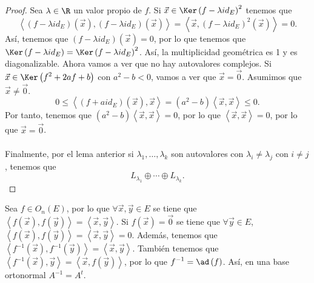 \begin{proof}
Sea $\displaystyle \lambda \in \R $ un valor propio de $\displaystyle f $. Si $\displaystyle \vec{x} \in \Ker\left(f- \lambda id _{E}\right)^{2} $ tenemos que
\[ \left\langle \left(f-\lambda id _{E}\right)\left(\vec{x}\right), \left(f-\lambda id _{E}\right)\left(\vec{x}\right) \right\rangle = \left\langle \vec{x}, \left(f- \lambda id _{E}\right)^{2}\left(\vec{x}\right) \right\rangle = 0 .\]
Así, tenemos que $\displaystyle \left(f- \lambda id _{E}\right)\left(\vec{x}\right) = 0 $, por lo que tenemos que $\displaystyle \Ker\left(f-\lambda id _{E}\right) = \Ker\left(f - \lambda id _{E}\right)^{2} $. Así, la multiplicidad geométrica  es 1 y es diagonalizable. 
Ahora vamos a ver que no hay autovalores complejos. Si $\displaystyle \vec{x} \in \Ker\left(f^{2}+2af+b\right) $ con $\displaystyle a^{2}-b<0 $, vamos a ver que $\displaystyle \vec{x} = \vec{0} $. Asumimos que $\displaystyle \vec{x} \neq \vec{0} $. 
\[ 0 \leq \left\langle \left(f+aid _{E}\right)\left(\vec{x}\right), \vec{x} \right\rangle = \left(a^{2}-b\right)\left\langle \vec{x}, \vec{x} \right\rangle \leq 0 .\]
Por tanto, tenemos que $\displaystyle \left(a^{2}-b\right)\left\langle \vec{x}, \vec{x} \right\rangle =0 $, por lo que $\displaystyle \left\langle \vec{x}, \vec{x} \right\rangle = 0 $, por lo que $\displaystyle \vec{x} = \vec{0} $. \\ \\
Finalmente, por el lema anterior si $\displaystyle \lambda_{1}, \ldots, \lambda_{k} $ son autovalores con $\displaystyle \lambda_{i} \neq \lambda_{j} $ con $\displaystyle i \neq j $, tenemos que
\[L_{\lambda_{1}} \oplus \cdots \oplus L_{\lambda_{k}} .\]
\end{proof}
\begin{observation}
\normalfont Sea $\displaystyle f \in O_{n}\left(E\right) $, por lo que $\displaystyle \forall \vec{x}, \vec{y} \in E $ se tiene que $\displaystyle \left\langle f\left(\vec{x}\right), f\left(\vec{y}\right) \right\rangle = \left\langle \vec{x}, \vec{y} \right\rangle  $. Si $\displaystyle f\left(\vec{x}\right) = \vec{0} $ se tiene que $\displaystyle \forall \vec{y} \in E $, $\displaystyle \left\langle f\left(\vec{x}\right), f\left(\vec{y}\right) \right\rangle =\left\langle \vec{x}, \vec{y} \right\rangle =0 $.
Además, tenemos que $\displaystyle \left\langle f^{-1}\left(\vec{x}\right), f^{-1}\left(\vec{y}\right) \right\rangle = \left\langle \vec{x}, \vec{y} \right\rangle  $. También tenemos que $\displaystyle \left\langle f^{-1}\left(\vec{x}\right), \vec{y} \right\rangle = \left\langle \vec{x}, f\left(\vec{y}\right) \right\rangle  $, por lo que $\displaystyle f^{-1} = \ad\left(f\right) $. Así, en una base ortonormal $\displaystyle A^{-1} = A^{t} $.
\end{observation}
